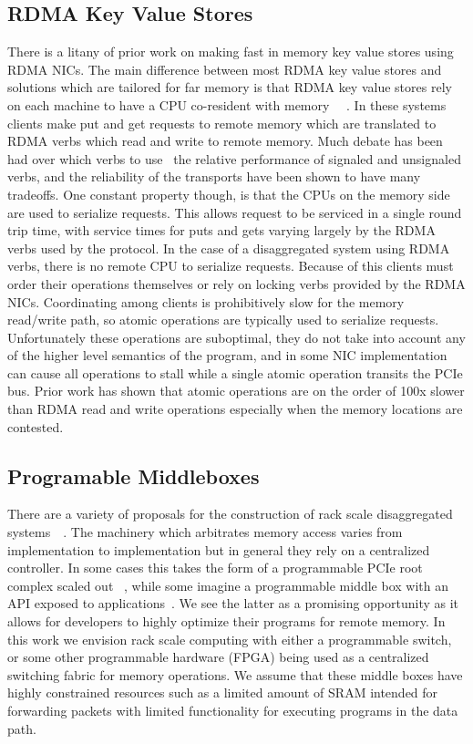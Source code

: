 \subsection{RDMA Key Value Stores}

There is a litany of prior work on making fast in memory key value stores using
RDMA NICs. The main difference between most RDMA key value stores and solutions
which are tailored for far memory is that RDMA key value stores rely on each
machine to have a CPU co-resident with memory~\cite{MemC3,herd,pilaf,sonuma,storm}
~. In these systems clients make put and get requests to remote memory
which are translated to RDMA verbs which read and write to remote memory. Much
debate has been had over which verbs to use~\cite{ erpc, herd,storm} the
relative performance of signaled and unsignaled verbs, and the reliability of
the transports have been shown to have many tradeoffs. One constant property
though, is that the CPUs on the memory side are used to serialize requests. This
allows request to be serviced in a single round trip time, with service times
for puts and gets varying largely by the RDMA verbs used by the protocol. In the
case of a disaggregated system using RDMA verbs, there is no remote CPU to
serialize requests. Because of this clients must order their operations
themselves or rely on locking verbs provided by the RDMA NICs. Coordinating
among clients is prohibitively slow for the memory read/write path, so atomic
operations are typically used to serialize requests. Unfortunately these
operations are suboptimal, they do not take into account any of the higher level
semantics of the program, and in some NIC implementation can cause all operations
to stall while a single atomic operation transits the PCIe bus. Prior work has
shown that atomic operations are on the order of 100x slower than RDMA read and
write operations especially when the memory locations are contested.

\subsection{Programable Middleboxes}

There are a variety of proposals for the construction of rack scale
disaggregated systems~\cite{disandapp,beyond,firebox}~. The
machinery which arbitrates memory access varies from implementation to
implementation but in general they rely on a centralized controller. In some
cases this takes the form of a programmable PCIe root complex scaled out
~, while some imagine a programmable middle box with an API exposed
to applications~\cite{disandapp}. We see the latter as a promising opportunity
as it allows for developers to highly optimize their programs for remote memory.
In this work we envision rack scale computing with either a programmable switch,
or some other programmable hardware (FPGA) being used as a centralized switching
fabric for memory operations. We assume that these middle boxes have highly
constrained resources such as a limited amount of SRAM intended for forwarding
packets with limited functionality for executing programs in the data path.

